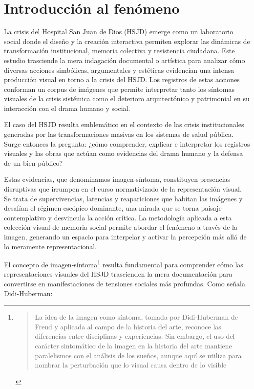 \section*{Introducción al fenómeno}

La crisis del Hospital San Juan de Dios (HSJD) emerge como un laboratorio social donde el diseño y la creación interactiva permiten explorar las dinámicas de transformación institucional, memoria colectiva y resistencia ciudadana. Este estudio trasciende la mera indagación documental o artística para analizar cómo diversas acciones simbólicas, argumentales y estéticas evidencian una intensa producción visual en torno a la crisis del HSJD. Los registros de estas acciones conforman un corpus de imágenes que permite interpretar tanto los síntomas visuales de la crisis sistémica como el deterioro arquitectónico y patrimonial en su interacción con el drama humano y social.

El caso del HSJD resulta emblemático en el contexto de las crisis institucionales generadas por las transformaciones masivas en los sistemas de salud pública. Surge entonces la pregunta: ¿cómo comprender, explicar e interpretar los registros visuales y las obras que actúan como evidencias del drama humano y la defensa de un bien público?

\textcolor{edit30sept}{Estas evidencias, que denominamos imagen-síntoma, constituyen presencias disruptivas que irrumpen en el curso \textcolor{edit30sept}{normativizado} de la representación visual. Se trata de supervivencias, latencias y reapariciones que habitan las imágenes y desafían el régimen escópico dominante, una mirada que se torna paisaje contemplativo y desvincula la acción crítica. La metodología aplicada a esta colección visual de memoria social permite abordar el fenómeno a través de la imagen, generando un espacio para interpelar y activar la percepción más allá de lo meramente representacional.}

El concepto de imagen-síntoma\footnote{\begin{quote}La idea de la imagen como síntoma, tomada por Didi-Huberman de Freud y aplicada al campo de la historia del arte, reconoce las diferencias entre disciplinas y experiencias. Sin embargo, el uso del carácter sintomático de la imagen en la historia del arte mantiene paralelismos con el análisis de los sueños, aunque aquí se utiliza para nombrar la perturbación que lo visual causa dentro de lo visible \parencite[p. 37]{VegaArevalo2017}\end{quote}} resulta fundamental para comprender cómo las representaciones visuales del HSJD trascienden la mera documentación para convertirse en manifestaciones de tensiones sociales más profundas. Como señala Didi-Huberman:

